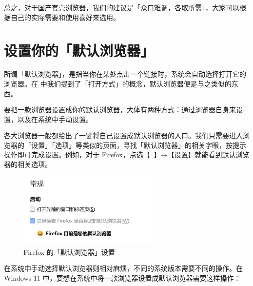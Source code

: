 总之，对于国产套壳浏览器，我们的建议是「众口难调，各取所需」，大家可以根据自己的实际需要和使用喜好来选用。

\section{设置你的「默认浏览器」}

所谓「默认浏览器」，是指当你在某处点击一个链接时，系统会自动选择打开它的浏览器。在 中我们提到了「打开方式」的概念，默认浏览器便是与之类似的东西。

要把一款浏览器设置成你的默认浏览器，大体有两种方式：通过浏览器自身来设置，以及在系统中手动设置。

各大浏览器一般都给出了一键将自己设置成默认浏览器的入口。我们只需要进入浏览器的「设置」「选项」等类似的页面，寻找「默认浏览器」的相关字眼，按提示操作即可完成设置。例如，对于 Firefox，点选【≡】→【设置】就能看到默认浏览器的相关选项。

\begin{figure}[htb!]
  \centering
  \includegraphics[width=7cm]{assets/software/Firefox_default_browser.png}
  \caption{Firefox 的「默认浏览器」设置}
  \label{fig:Firefox_default_browser}
\end{figure}

在系统中手动选择默认浏览器则相对麻烦，不同的系统版本需要不同的操作。在 Windows 11 中，要想在系统中将一款浏览器设置成默认浏览器需要这样操作：

